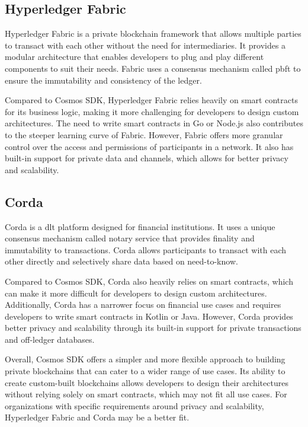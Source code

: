 \subsection{Hyperledger Fabric}

Hyperledger Fabric is a private blockchain framework that allows multiple parties to transact with each other without the need for intermediaries. It provides a modular architecture that enables developers to plug and play different components to suit their needs. Fabric uses a consensus mechanism called \gls{pbft} to ensure the immutability and consistency of the ledger.

Compared to Cosmos SDK, Hyperledger Fabric relies heavily on smart contracts for its business logic, making it more challenging for developers to design custom architectures. The need to write smart contracts in Go or Node.js also contributes to the steeper learning curve of Fabric. However, Fabric offers more granular control over the access and permissions of participants in a network. It also has built-in support for private data and channels, which allows for better privacy and scalability.

\subsection{Corda}

Corda is a \gls{dlt} platform designed for financial institutions. It uses a unique consensus mechanism called notary service that provides finality and immutability to transactions. Corda allows participants to transact with each other directly and selectively share data based on need-to-know.

Compared to Cosmos SDK, Corda also heavily relies on smart contracts, which can make it more difficult for developers to design custom architectures. Additionally, Corda has a narrower focus on financial use cases and requires developers to write smart contracts in Kotlin or Java. However, Corda provides better privacy and scalability through its built-in support for private transactions and off-ledger databases.

Overall, Cosmos SDK offers a simpler and more flexible approach to building private blockchains that can cater to a wider range of use cases. Its ability to create custom-built blockchains allows developers to design their architectures without relying solely on smart contracts, which may not fit all use cases. For organizations with specific requirements around privacy and scalability, Hyperledger Fabric and Corda may be a better fit.

